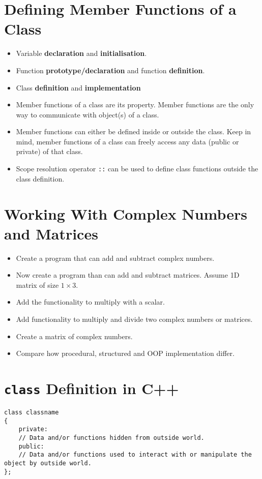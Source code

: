 \documentclass[12pt,a4paper]{article}
\begin{document}
\section{Defining Member Functions of a Class}
\begin{itemize}
\item Variable \textbf{declaration} and \textbf{initialisation}.
\item Function \textbf{prototype/declaration} and function \textbf{definition}.
\item Class \textbf{definition} and \textbf{implementation}
\item Member functions of a class are its property. Member functions are the only way to communicate with object(s) of a class.
\item Member functions can either be defined inside or outside the class. Keep in mind, member functions of a class can freely access any data (public or private) of that class.
\item Scope resolution operator \verb|::| can be used to define class functions outside the class definition.
\end{itemize}
\section{Working With Complex Numbers and Matrices}
\begin{itemize}
\item Create a program that can add and subtract complex numbers.
\item Now create a program than can add and subtract matrices. Assume 1D matrix of size $1\times 3$.
\item Add the functionality to multiply with a scalar.
\item Add functionality to multiply and divide two complex numbers or matrices.
\item Create a matrix of complex numbers.
\item Compare how procedural, structured and OOP implementation differ.
\end{itemize}
\section{\texttt{class} Definition in C++}
\begin{lstlisting}[caption={\texttt{class} definition}]
class classname
{
	private:
	// Data and/or functions hidden from outside world.
	public:
	// Data and/or functions used to interact with or manipulate the object by outside world.	
};
\end{lstlisting}
\end{document}
